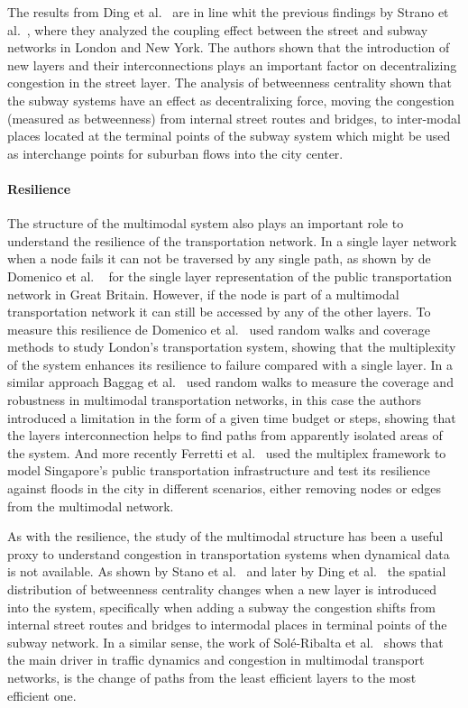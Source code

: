 The results from Ding et al.~\cite{ding2018traffic} are in line whit the previous findings by Strano et al.~\cite{strano2015features}, where they analyzed the coupling effect between the street and subway networks in London and New York. The authors shown that the introduction of new layers and their interconnections plays an important factor on decentralizing congestion in the street layer. The analysis of betweenness centrality shown that the subway systems have an effect as decentralixing force, moving the congestion (measured as betweenness) from internal street routes and bridges, to inter-modal places located at the terminal points of the subway system which might be used as interchange points for suburban flows into the city center.


\paragraph*{Resilience}
The structure of the multimodal system also plays an important role to understand the resilience of the transportation network. In a single layer network when a node fails it can not be traversed by any single path, as shown by de Domenico et al. ~\cite{dedomenico2019public} for the single layer representation of the public transportation network in Great Britain. However, if the node is part of a multimodal transportation network it can still be accessed by any of the other layers. To measure this resilience de Domenico et al.~\cite{dedomenico2014interconnected} used random walks and coverage methods to study London's transportation system, showing that the multiplexity of the system enhances its resilience to failure compared with a single layer. In a similar approach Baggag et al.~\cite{baggag2018resilience} used random walks to measure the coverage and robustness in multimodal transportation networks, in this case the authors introduced a limitation in the form of a given time budget or steps, showing that the layers interconnection helps to find paths from apparently isolated areas of the system. And more recently Ferretti et al.~\cite{ferretti2019resilience} used the multiplex framework to model Singapore's public transportation infrastructure and test its resilience against floods in the city in different scenarios, either removing nodes or edges from the multimodal network.

As with the resilience, the study of the multimodal structure has been a useful proxy to understand congestion in transportation systems when dynamical data is not available. As shown by Stano et al.~\cite{strano2015features} and later by Ding et al.~\cite{ding2018traffic} the spatial distribution of betweenness centrality changes when a new layer is introduced into the system, specifically when adding a subway the congestion shifts from internal street routes and bridges to intermodal places in terminal points of the subway network. In a similar sense, the work of Sol\'{e}-Ribalta et al.~\cite{sole-ribalta2016congestion} shows that the main driver in traffic dynamics and congestion in multimodal transport networks, is the change of paths from the least efficient layers to the most efficient one.


